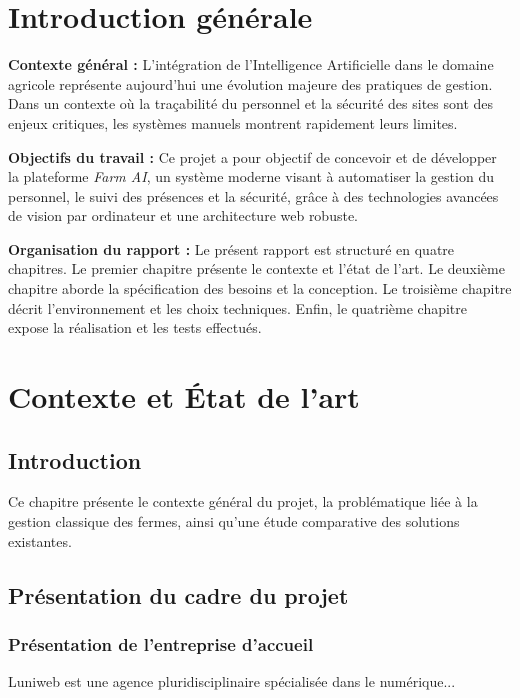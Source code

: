 \documentclass[12pt,a4paper]{report}
\begin{document}
\chapter*{Introduction générale}

\textbf{Contexte général :}
L'intégration de l'Intelligence Artificielle dans le domaine agricole représente aujourd'hui une
évolution majeure des pratiques de gestion. Dans un contexte où la traçabilité du personnel et la
sécurité des sites sont des enjeux critiques, les systèmes manuels montrent rapidement leurs limites.

\textbf{Objectifs du travail :}
Ce projet a pour objectif de concevoir et de développer la plateforme \textit{Farm AI}, un système
moderne visant à automatiser la gestion du personnel, le suivi des présences et la sécurité, grâce
à des technologies avancées de vision par ordinateur et une architecture web robuste.

\textbf{Organisation du rapport :}
Le présent rapport est structuré en quatre chapitres. Le premier chapitre présente le contexte et
l'état de l'art. Le deuxième chapitre aborde la spécification des besoins et la conception. Le
troisième chapitre décrit l'environnement et les choix techniques. Enfin, le quatrième chapitre
expose la réalisation et les tests effectués.

\chapter{Contexte et État de l'art}

\section{Introduction}
Ce chapitre présente le contexte général du projet, la problématique liée à la gestion classique
des fermes, ainsi qu'une étude comparative des solutions existantes.

\section{Présentation du cadre du projet}

\subsection{Présentation de l'entreprise d'accueil}
Luniweb est une agence pluridisciplinaire spécialisée dans le numérique...
\end{document}
